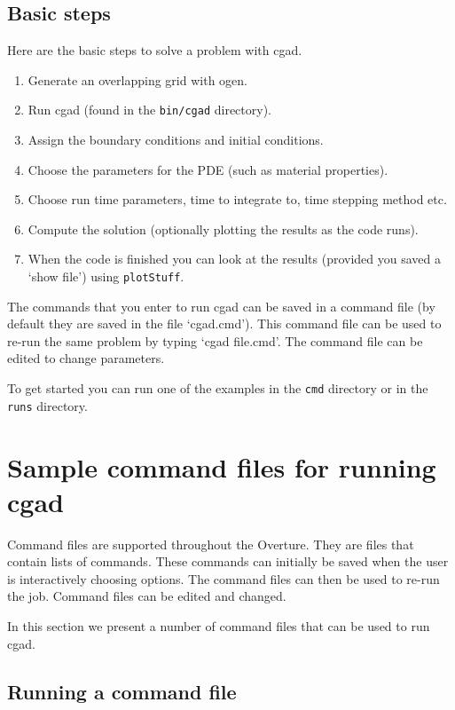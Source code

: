 \documentclass[11pt]{article}
\newcommand{\Index}[1]{#1\index{#1}}
\begin{document}
\subsection{Basic steps}
Here are the basic steps to solve a problem with cgad.
\begin{enumerate}
  \item Generate an overlapping grid with ogen. 
  \item Run cgad (found in the {\tt bin/cgad} directory).
  \item Assign the boundary conditions and initial conditions.
  \item Choose the parameters for the PDE (such as material properties).
  \item Choose run time parameters, time to integrate to, time stepping method etc.
  \item Compute the solution (optionally plotting the results as the code runs).
  \item When the code is finished you can look at the results (provided you saved a
     `show file') using {\tt plotStuff}.
\end{enumerate}
The commands that you enter to run cgad can be saved in a \Index{command file} (by default
they are saved in the file `cgad.cmd'). This command file can be used to re-run
the same problem by typing `cgad file.cmd'. The command file can be edited to change parameters.

To get started you can run one of the examples in the {\tt cmd} directory or
in the {\tt runs} directory.

\clearpage
\section{Sample command files for running cgad} \label{sec:demo}

Command files are supported throughout the Overture. They are files
that contain lists of commands. These commands can initially be saved
when the user is interactively choosing options.  The \Index{command files}
can then be used to re-run the job. Command files can be edited and
changed.

In this section we present a number of command files that can be used
to run cgad.

\subsection{Running a command file} \label{sec:runningCommandFiles} 
\end{document}
